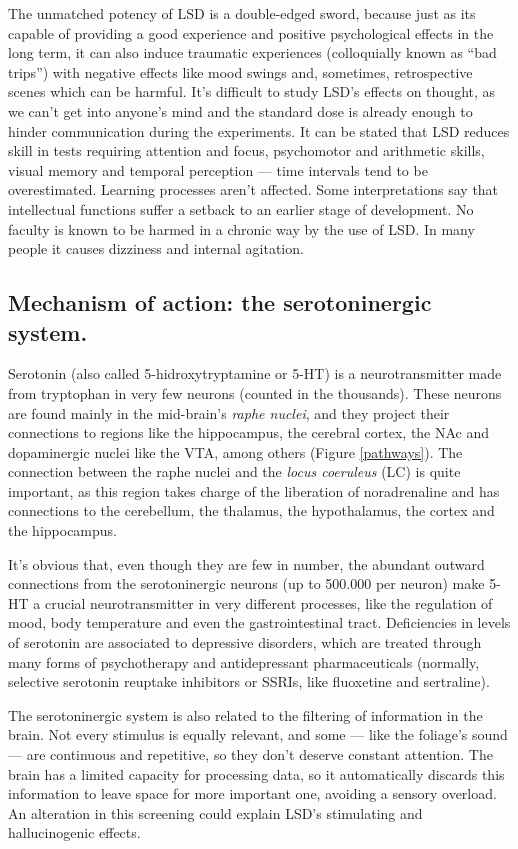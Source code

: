 The unmatched potency of LSD is a double-edged sword, because just as its capable of providing a good experience and positive psychological effects in the long term, it can also induce traumatic experiences (colloquially known as \enquote{bad trips}) with negative effects like mood swings and, sometimes, retrospective scenes which can be harmful. It's difficult to study LSD's effects on thought, as we can't get into anyone's mind and the standard dose is already enough to hinder communication during the experiments. It can be stated that LSD reduces skill in tests requiring attention and focus, psychomotor and arithmetic skills, visual memory and temporal perception --- time intervals tend to be overestimated. Learning processes aren't affected. Some interpretations say that intellectual functions suffer a setback to an earlier stage of development. No faculty is known to be harmed in a chronic way by the use of LSD. In many people it causes dizziness and internal agitation.

\subsection{Mechanism of action: the serotoninergic system.}

Serotonin (also called 5-hidroxytryptamine or 5-HT) is a neurotransmitter made from tryptophan in very few neurons (counted in the thousands). These neurons are found mainly in the mid-brain's \textit{raphe nuclei}, and they project their connections to regions like the hippocampus, the cerebral cortex, the NAc and dopaminergic nuclei like the VTA, among others (Figure \ref{pathways}). The connection between the raphe nuclei and the \textit{locus coeruleus} (LC) is quite important, as this region takes charge of the liberation of noradrenaline and has connections to the cerebellum, the thalamus, the hypothalamus, the cortex and the hippocampus.

It's obvious that, even though they are few in number, the abundant outward connections from the serotoninergic neurons (up to 500.000 per neuron) make 5-HT a crucial neurotransmitter in very different processes, like the regulation of mood, body temperature and even the gastrointestinal tract. Deficiencies in levels of serotonin are associated to depressive disorders, which are treated through many forms of psychotherapy and antidepressant pharmaceuticals (normally, selective serotonin reuptake inhibitors or SSRIs, like fluoxetine and sertraline).

The serotoninergic system is also related to the filtering of information in the brain. Not every stimulus is equally relevant, and some --- like the foliage's sound --- are continuous and repetitive, so they don't deserve constant attention. The brain has a limited capacity for processing data, so it automatically discards this information to leave space for more important one, avoiding a sensory overload. An alteration in this screening could explain LSD's stimulating and hallucinogenic effects.

